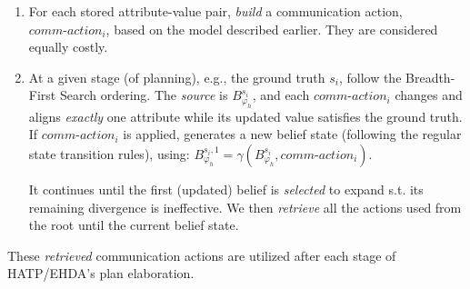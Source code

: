 \documentclass[letterpaper]{article} %
\newtheorem{theorem}{Theorem}[section]
\begin{document}
\begin{itemize}
\begin{enumerate}
        \item For each stored attribute-value pair, \textit{build} a communication action, $\textit{comm-action}_i$, based on the model described earlier. They are considered equally costly.  
        \item 
         
        At a given stage (of planning), e.g., the ground truth $s_i$, follow the Breadth-First Search ordering. 
        The \textit{source} is $B_{\varphi_h}^{s_i}$, and each $\textit{comm-action}_i$ changes and aligns \textit{exactly} one attribute while its updated value satisfies the ground truth. If $\textit{comm-action}_i$ is applied, generates a new belief state (following the regular state transition rules), using: $B_{\varphi_h}^{s_i,1} = \gamma(B_{\varphi_h}^{s_i}, \textit{comm-action}_i)$.
        
        It continues until the first (updated) belief is \textit{selected} to expand s.t. its remaining divergence is ineffective. We then \textit{retrieve} all the actions used from the root until the current belief state.   
    \end{enumerate}

\end{itemize}



These \textit{retrieved} communication actions are utilized after each stage of HATP/EHDA's plan elaboration.



\end{document}
